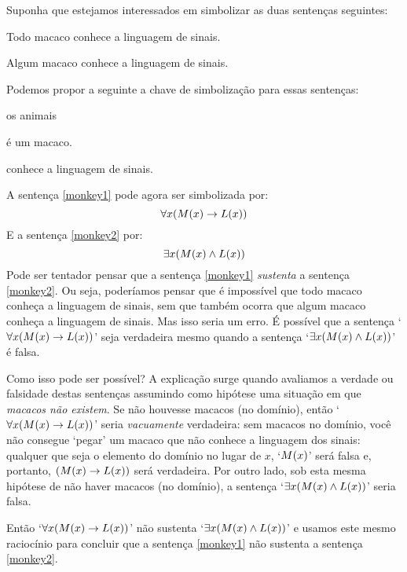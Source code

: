 Suponha que estejamos interessados em  simbolizar as duas sentenças seguintes:
	\begin{earg}
		\item[\ex{monkey1}] Todo macaco conhece a linguagem de sinais.
		\item[\ex{monkey2}] Algum macaco conhece a linguagem de sinais.
	\end{earg}
Podemos propor a seguinte a chave de simbolização para essas sentenças:
	\begin{center}
	\begin{ekey}
		\item[\text{domínio}] os animais
		\item[\atom{M}{x}]  é um macaco.
		\item[\atom{L}{x}]  conhece a linguagem de sinais.
	\end{ekey}
	\end{center}
A sentença \ref{monkey1} pode agora ser simbolizada por:
$$\forall x(\mathord{M}(x) \rightarrow \mathord{L}(x))$$
E a sentença \ref{monkey2} por:
$$\exists x(\mathord{M}(x) \wedge \mathord{L}(x))$$
Pode ser tentador pensar que a sentença \ref{monkey1} \emph{sustenta} a sentença \ref{monkey2}.
Ou seja, poderíamos pensar que é impossível que todo macaco conheça a linguagem de sinais, sem que também ocorra que algum macaco conheça a linguagem de sinais.
Mas isso seria um erro.
É possível que a sentença `$\forall x(\mathord{M}(x) \rightarrow \mathord{L}(x))$' seja verdadeira mesmo quando a sentença `$\exists x(\mathord{M}(x) \wedge \mathord{L}(x))$' é falsa.

Como isso pode ser possível?
A explicação surge quando avaliamos a verdade ou falsidade destas sentenças assumindo como hipótese uma situação em que \emph{macacos não existem}.
Se não houvesse macacos (no domínio), então `$\forall x(\mathord{M}(x) \rightarrow \mathord{L}(x))$' seria \emph{vacuamente} verdadeira:
sem macacos no domínio, você não consegue `pegar' um macaco que não conhece a linguagem dos sinais: qualquer que seja o elemento do domínio no lugar de $x$, `$\mathord{M}(x)$' será falsa e, portanto, $(\mathord{M}(x) \rightarrow \mathord{L}(x))$ será verdadeira.
Por outro lado, sob esta mesma hipótese de não haver macacos (no domínio), a sentença `$\exists x(\mathord{M}(x) \wedge \mathord{L}(x))$' seria falsa.

Então `$\forall x(\mathord{M}(x) \rightarrow \mathord{L}(x))$' não sustenta `$\exists x(\mathord{M}(x) \wedge \mathord{L}(x))$' e usamos este mesmo raciocínio para concluir que a sentença \ref{monkey1} não sustenta a sentença \ref{monkey2}.

